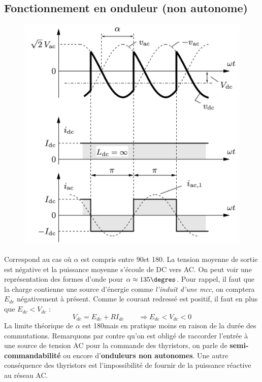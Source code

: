					\newpage
					
			\subsection{Fonctionnement en onduleur (non autonome)}
				\begin{figure}
				\vspace{-5mm}
				\includegraphics[scale=0.28]{ch3/9}
				\end{figure}
				Correspond au cas où $\alpha$ est compris entre 90\degres et 180\degres . La tension moyenne de sortie est négative et la puissance moyenne s'écoule de DC vers AC. On peut voir une représentation des formes d'onde pour $\alpha \approx 135\degres$. Pour rappel, il faut que la charge contienne une source d'énergie comme \textit{l'induit d'une mcc}, on comptera $E_{dc}$ négativement à présent. Comme le courant redressé est positif, il faut en plus que $E_{dc}<V_{dc}$ :
				\begin{equation}
					V_{dc} = E_{dc} + RI_{dc} \qquad \Rightarrow E_{dc} < V_{dc} < 0 
				\end{equation}
				La limite théorique de $\alpha$ est 180\degres mais en pratique moins en raison de la durée des commutations. Remarquons par contre qu'on est obligé de raccorder l'entrée à une source de tension AC pour la commande des thyristors, on parle de \textbf{semi-commandabilité} ou encore d'\textbf{onduleurs non autonomes}. Une autre conséquence des thyristors est l'impossibilité de fournir de la puissance réactive au réseau AC. 
				
